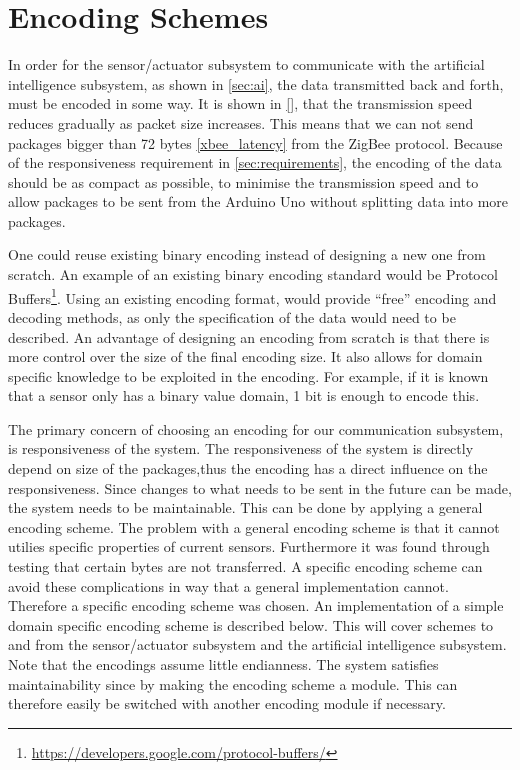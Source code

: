 \section{Encoding Schemes}
\label{sec:encoding}
In order for the sensor/actuator subsystem to communicate with the artificial intelligence subsystem, as shown in \cref{sec:ai}, the data transmitted back and forth, must be encoded in some way. It is shown in \cref{}, that the transmission speed reduces gradually as packet size increases. This means that we can not send packages bigger than 72 bytes \cref{xbee_latency} from the ZigBee protocol. Because of the responsiveness requirement in \cref{sec:requirements}, the encoding of the data should be as compact as possible, to minimise the transmission speed and to allow packages to be sent from the Arduino Uno without splitting data into more packages.

One could reuse existing binary encoding instead of designing a new one from scratch. An example of an existing binary encoding standard would be Protocol Buffers\footnote{\url{https://developers.google.com/protocol-buffers/}}. Using an existing encoding format, would provide \enquote{free} encoding and decoding methods, as only the specification of the data would need to be described. An advantage of designing an encoding from scratch is that there is more control over the size of the final encoding size. It also allows for domain specific knowledge to be exploited in the encoding. For example, if it is known that a sensor only has a binary value domain, 1 bit is enough to encode this.

The primary concern of choosing an encoding for our communication subsystem, is responsiveness of the system. 
The responsiveness of the system is directly depend on size of the packages,thus the encoding has a direct influence on the responsiveness. Since changes to what needs to be sent in the future can be made, the system needs to be maintainable. This can be done by applying a general encoding scheme. The problem with a general encoding scheme is that it cannot utilies specific properties of current sensors. Furthermore it  was found through testing that certain bytes are not transferred. A specific encoding scheme can avoid these complications in way that a general implementation cannot. Therefore a specific encoding scheme was chosen. An implementation of a simple domain specific encoding scheme is described below. This will cover schemes to and from the sensor/actuator subsystem and the artificial intelligence subsystem. Note that the encodings assume little endianness. The system satisfies maintainability since by making the encoding scheme a module. This can therefore easily be switched with another encoding module if necessary.

